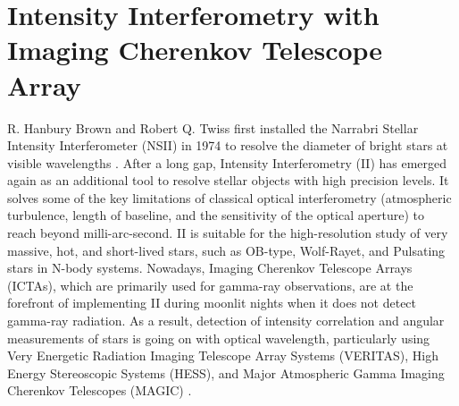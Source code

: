 \section{Intensity Interferometry with Imaging Cherenkov Telescope Array}

R. Hanbury Brown and Robert Q. Twiss first installed the Narrabri Stellar Intensity Interferometer (NSII) in 1974 to resolve the diameter of bright stars at visible wavelengths \citep{brown1954lxxiv, brown1974intensity}. After a long gap, Intensity Interferometry (II) has emerged again as an additional tool to resolve stellar objects with high precision levels. It solves some of the key limitations of classical optical interferometry (atmospheric turbulence, length of baseline, and the sensitivity of the optical aperture) to reach beyond milli-arc-second. II is suitable for the high-resolution study of very massive, hot, and short-lived stars, such as OB-type, Wolf-Rayet, and Pulsating stars in N-body systems. Nowadays, Imaging Cherenkov Telescope Arrays (ICTAs), which are primarily used for gamma-ray observations, are at the forefront of implementing II during moonlit nights when it does not detect gamma-ray radiation. As a result, detection of intensity correlation and angular measurements of stars is going on with optical wavelength, particularly using Very Energetic Radiation Imaging Telescope Array Systems (VERITAS), High Energy Stereoscopic Systems (HESS), and Major Atmospheric Gamma Imaging Cherenkov Telescopes (MAGIC) \citep{kieda2022performance, zmija2022optical, abe2024performance}.

